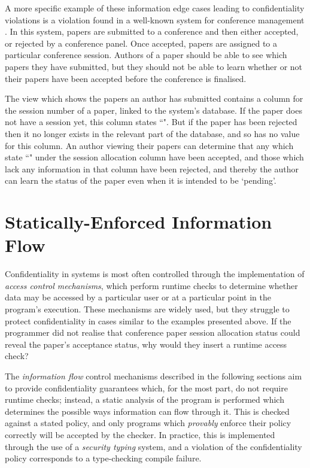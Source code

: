A more specific example of these information edge cases leading to confidentiality violations is a violation found in a well-known system for conference management \cite{agrawal2016edas_conf} \cite{polikarpova2016lifty}. In this system, papers are submitted to a conference and then either accepted, or rejected by a conference panel. Once accepted, papers are assigned to a particular conference session. Authors of a paper should be able to see which papers they have submitted, but they should not be able to learn whether or not their papers have been accepted before the conference is finalised.

The view which shows the papers an author has submitted contains a column for the session number of a paper, linked to the system's database. If the paper does not have a session yet, this column states ``". But if the paper has been rejected then it no longer exists in the relevant part of the database, and so has no value for this column. An author viewing their papers can determine that any which state ``" under the session allocation column have been accepted, and those which lack any information in that column have been rejected, and thereby the author can learn the status of the paper even when it is intended to be `pending'.

\section{Statically-Enforced Information Flow}

Confidentiality in systems is most often controlled through the implementation of \textit{access control mechanisms}, which perform runtime checks to determine whether data may be accessed by a particular user or at a particular point in the program's execution. These mechanisms are widely used, but they struggle to protect confidentiality in cases similar to the examples presented above. If the programmer did not realise that conference paper session allocation status could reveal the paper's acceptance status, why would they insert a runtime access check?

The \textit{information flow} control mechanisms described in the following sections aim to provide confidentiality guarantees which, for the most part, do not require runtime checks; instead, a static analysis of the program is performed which determines the possible ways information can flow through it. This is checked against a stated policy, and only programs which \textit{provably} enforce their policy correctly will be accepted by the checker. In practice, this is implemented through the use of a \textit{security typing} system, and a violation of the confidentiality policy corresponds to a type-checking compile failure.



